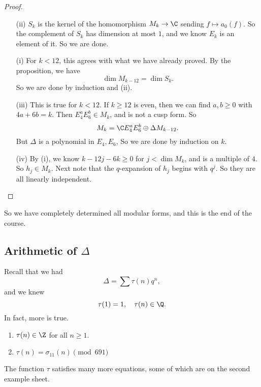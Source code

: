 \documentclass[a4paper]{article}
\begin{document}
\begin{proof}\leavevmode
  \begin{enumerate}
    \item[(ii)] $S_k$ is the kernel of the homomorphism $M_k \to \C$ sending $f \mapsto a_0(f)$. So the complement of $S_k$ has dimension at most $1$, and we know $E_k$ is an element of it. So we are done.
    \item[(i)] For $k < 12$, this agrees with what we have already proved. By the proposition, we have
      \[
        \dim M_{k - 12} = \dim S_k.
      \]
      So we are done by induction and (ii).
    \item[(iii)] This is true for $k < 12$. If $k \geq 12$ is even, then we can find $a, b \geq 0$ with $4a + 6b = k$. Then $E_4^a E_6^b \in M_k$, and is not a cusp form. So
      \[
        M_k = \C E_4^a E_6^b \oplus \Delta M_{k - 12}.
      \]
      But $\Delta$ is a polynomial in $E_4, E_6$, So we are done by induction on $k$.
    \item[(iv)] By (i), we know $k - 12j - 6k \geq 0$ for $j < \dim M_k$, and is a multiple of $4$. So $h_j \in M_k$. Next note that the $q$-expansion of $h_j$ begins with $q^j$. So they are all linearly independent.\qedhere
  \end{enumerate}
\end{proof}
So we have completely determined all modular forms, and this is the end of the course.

\newpage
\subsection{Arithmetic of $\Delta$}
Recall that we had
\[
  \Delta = \sum \tau(n) q^n,
\]
and we knew
\[
  \tau(1) = 1,\quad \tau(n) \in \Q.
\]
In fact, more is true.
\begin{prop}\leavevmode
  \begin{enumerate}
    \item $\tau(n) \in \Z$ for all $n \geq 1$.
    \item $\tau(n) = \sigma_{11}(n) \pmod {691}$
  \end{enumerate}
\end{prop}
The function $\tau$ satisfies many more equations, some of which are on the second example sheet.
\end{document}
